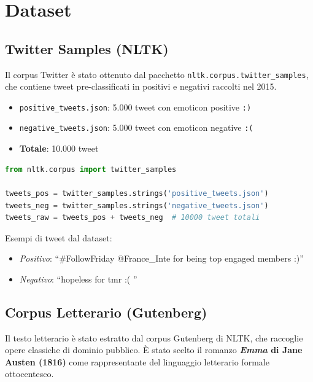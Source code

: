 \documentclass[12pt, a4paper]{article}
\begin{document}
\section{Dataset}

\subsection{Twitter Samples (NLTK)}

Il corpus Twitter è stato ottenuto dal pacchetto \texttt{nltk.corpus.twitter\_samples},
che contiene tweet pre-classificati in positivi e negativi raccolti nel 2015.

\begin{itemize}
    \item \texttt{positive\_tweets.json}: 5.000 tweet con emoticon positive \texttt{:)}
    \item \texttt{negative\_tweets.json}: 5.000 tweet con emoticon negative \texttt{:(}
    \item \textbf{Totale}: 10.000 tweet
\end{itemize}

\begin{lstlisting}[language=Python, caption=Caricamento dataset Twitter]
from nltk.corpus import twitter_samples

tweets_pos = twitter_samples.strings('positive_tweets.json')
tweets_neg = twitter_samples.strings('negative_tweets.json')
tweets_raw = tweets_pos + tweets_neg  # 10000 tweet totali
\end{lstlisting}

Esempi di tweet dal dataset:

\begin{itemize}
    \item \textit{Positivo}: ``\#FollowFriday @France\_Inte for being top engaged members :)''
    \item \textit{Negativo}: ``hopeless for tmr :( ''
\end{itemize}

\subsection{Corpus Letterario (Gutenberg)}

Il testo letterario è stato estratto dal corpus Gutenberg di NLTK, che raccoglie
opere classiche di dominio pubblico. È stato scelto il romanzo
\textbf{\textit{Emma} di Jane Austen (1816)} come rappresentante del linguaggio
letterario formale ottocentesco.
\end{document}
